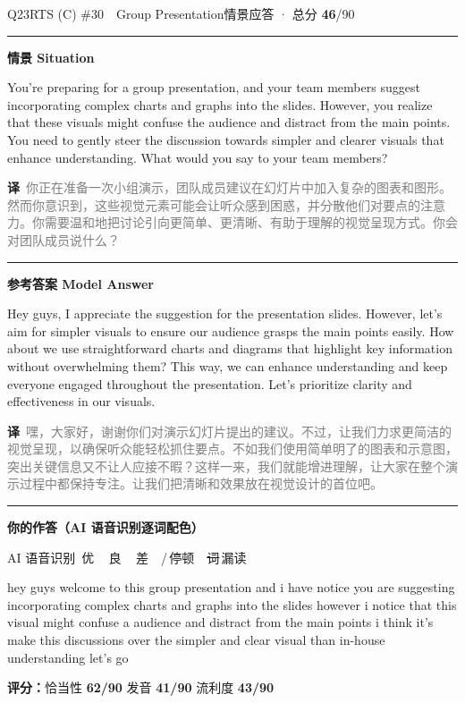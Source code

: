 \documentclass[11pt]{article}
\newcommand{\sfull}[1]{\textcolor{cFix}{\bfseries #1}}     %
\newcommand{\spart}[1]{\textcolor{cPartial}{\bfseries #1}} %
\newcommand{\ptesub}[1]{%
  \par\needspace{2\baselineskip}\smallskip
  {\color{cAccent}\rule[-0.2ex]{3pt}{1.05em}}\hspace{6pt}%
  {\bfseries\color{cHead}#1}\par\nopagebreak\smallskip}
\newcommand{\sg}[1]{\textcolor{cSpkGood}{#1}}   %
\newcommand{\sy}[1]{\textcolor{cSpkOk}{#1}}     %
\newcommand{\sr}[1]{\textcolor{cSpkBad}{#1}}    %
\newcommand{\asrlegend}{{\footnotesize\color{gray}AI 语音识别\quad
  {\color{cSpkGood}\textbullet}\,优\ \ {\color{cSpkOk}\textbullet}\,良\ \
  {\color{cSpkBad}\textbullet}\,差\ \ {\color{gray}/}\,停顿\ \
  {\color{cSpkBad}\sout{词}}\,漏读}}
\newcommand{\zh}[1]{{\footnotesize\textcolor{cNote}{\textbf{译}}\ \textcolor{gray}{#1}}}
\begin{document}
\begin{qblock}{Q23\quad RTS (C) \#30\ \ Group Presentation}{情景应答 · 总分 \textcolor{cAccent}{\bfseries 46}/90}
\ptesub{情景 Situation}
\begin{promptbox}
You're preparing for a group presentation, and your team members suggest incorporating complex charts and graphs into the slides. However, you realize that these visuals might confuse the audience and distract from the main points. You need to gently steer the discussion towards simpler and clearer visuals that enhance understanding. What would you say to your team members?
\end{promptbox}
\zh{你正在准备一次小组演示，团队成员建议在幻灯片中加入复杂的图表和图形。然而你意识到，这些视觉元素可能会让听众感到困惑，并分散他们对要点的注意力。你需要温和地把讨论引向更简单、更清晰、有助于理解的视觉呈现方式。你会对团队成员说什么？}
\ptesub{参考答案 Model Answer}
\begin{modelbox}
Hey guys, I appreciate the suggestion for the presentation slides. However, let's aim for simpler visuals to ensure our audience grasps the main points easily. How about we use straightforward charts and diagrams that highlight key information without overwhelming them? This way, we can enhance understanding and keep everyone engaged throughout the presentation. Let's prioritize clarity and effectiveness in our visuals.
\end{modelbox}
\zh{嘿，大家好，谢谢你们对演示幻灯片提出的建议。不过，让我们力求更简洁的视觉呈现，以确保听众能轻松抓住要点。不如我们使用简单明了的图表和示意图，突出关键信息又不让人应接不暇？这样一来，我们就能增进理解，让大家在整个演示过程中都保持专注。让我们把清晰和效果放在视觉设计的首位吧。}
\ptesub{你的作答（AI 语音识别逐词配色）}
\asrlegend
\begin{asrbox}
\sg{hey} \sg{guys} \sy{welcome} \sg{to} \sg{this} \sg{group} \sy{presentation} \sg{and} \sg{i} \sg{have} \sy{notice} \sy{you} \sg{are} \sg{suggesting} \sg{incorporating} \sy{complex} \sr{charts} \sy{and} \sg{graphs} \sg{into} \sg{the} \sg{slides} \sg{however} \sy{i} \sg{notice} \sy{that} \sy{this} \sg{visual} \sy{might} \sg{confuse} \sg{a} \sg{audience} \sg{and} \sy{distract} \sg{from} \sg{the} \sy{main} \sg{points} \sy{i} \sy{think} \sy{it's} \sg{make} \sg{this} \sy{discussions} \sy{over} \sg{the} \sg{simpler} \sy{and} \sg{clear} \sg{visual} \sg{than} \sy{in-house} \sg{understanding} \sg{let's} \sg{go}
\end{asrbox}
\smallskip
{\small\textbf{评分：}恰当性 \sfull{62/90} \quad\textperiodcentered\quad 发音 \spart{41/90} \quad\textperiodcentered\quad 流利度 \spart{43/90}}
\end{qblock}
\end{document}
